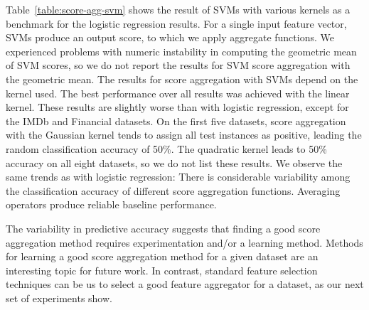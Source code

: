 \documentclass[conference]{IEEEtran}
\begin{document}
Table~\ref{table:score-agg-svm} shows the result of SVMs with various kernels as a benchmark for the logistic regression results. For a single input feature vector, SVMs produce an output score, to which we apply aggregate functions. We experienced problems with numeric instability in computing the geometric mean of SVM scores, so we do not report the results for SVM score aggregation with the geometric mean. The results for score aggregation with SVMs depend on the kernel used. The best performance over all results was achieved with the linear kernel. These results are slightly worse than with logistic regression, except for the IMDb and Financial datasets. On the first five datasets, score aggregation with the Gaussian kernel tends to assign all test instances as positive, leading the random classification accuracy of 50\%. The quadratic kernel leads to 50\% accuracy on all eight datasets, so we do not list these results.
We observe the same trends as with logistic regression: There is considerable variability among the classification accuracy of different score aggregation functions. Averaging operators produce reliable baseline performance.

The variability in predictive accuracy suggests that finding a good score aggregation method requires experimentation and/or a learning method. Methods for learning a good score aggregation method for a given dataset are an interesting topic for future work. In contrast, standard feature selection techniques can be us to select a good feature aggregator for a dataset, as our next set of experiments show.%


\end{document}
